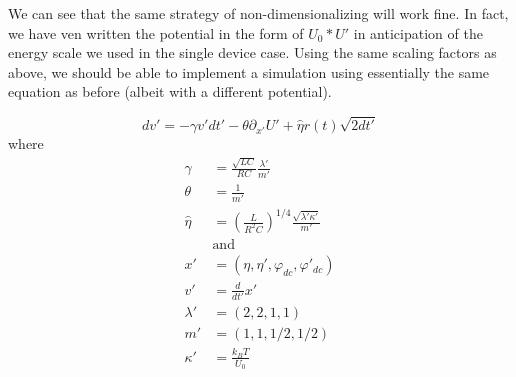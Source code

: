 \documentclass[paper=a4, twocolumn, fontsize=10pt]{article} %
\numberwithin{equation}{section} %
\numberwithin{figure}{section} %
\numberwithin{table}{section} %
\def \df#1{\hat{#1}}
\def \dl#1{#1}
\begin{document}
We can see that the same strategy of non-dimensionalizing will work fine. In fact, we have ven written the potential in the form of $U_0 * U'$ in anticipation of the energy scale we used in the single device case. Using the same scaling factors as above, we should be able to implement a simulation using essentially the same equation as before (albeit with a different potential).

\[ dv' = -\gamma v' dt' - \theta \partial_{x'} U' + \df\eta r(t) \sqrt{2dt'} \]
where
\begin{align*}
    \gamma &=  \frac{\sqrt{LC} }{ RC} \frac{\lambda'}{m'}  \\
    \theta &= \frac{1 }{ m'} \\
    \df\eta &= \left(  \frac{L}{R^2 C} \right)^{1/4} \frac{\sqrt{\lambda'\kappa'}}{m'} \\
    &\text{and} \\
    x' &= (\dl\eta, \dl\eta', \dl\varphi_{dc}, \dl\varphi'_{dc}) \\
    v' &= \frac{d}{dt'} x' \\
    \lambda' &= (2, 2, 1, 1) \\
    m' &= ( 1, 1, 1/2, 1/2) \\
    \kappa' &= \frac{k_B T}{U_0}
\end{align*}
\end{document}
